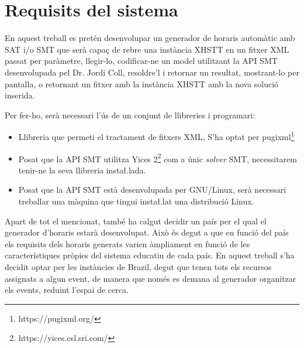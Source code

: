 \documentclass[11pt,a4paper,twoside]{report}
\begin{document}
  \chapter{Requisits del sistema}

  En aquest treball es pretén desenvolupar un generador de horaris automàtic 
  amb SAT i/o SMT que serà capaç de rebre una instància XHSTT en un fitxer XML passat per paràmetre, 
  llegir-lo, codificar-ne un model utilitzant la API SMT desenvolupada pel Dr. Jordi Coll, resoldre'l i retornar un resultat, mostrant-lo per pantalla, o retornant un fitxer amb la instància XHSTT amb la nova solució inserida.

  Per fer-ho, serà necessari l'ús de un conjunt de llibreries i programari:

  \begin{itemize}
    \item Llibreria que permeti el tractament de fitxers XML, S'ha optat per pugixml\footnote{https://pugixml.org/}
    \item Posat que la API SMT utilitza Yices 2\footnote{https://yices.csl.sri.com/} com a únic \textit{solver} SMT, necessitarem tenir-ne la seva llibreria insta\l.lada.
    \item Posat que la API SMT està desenvolupada per GNU/Linux, serà necessari treballar una màquina que tingui insta\l.lat una distribució Linux.
  \end{itemize}
  
  Apart de tot el mencionat, també ha calgut decidir un país per el qual el generador d'horaris estarà desenvolupat. Això és degut a que en funció del país els requisits dels horaris generats varien àmpliament en funció de les característiques pròpies del sistema educatiu de cada país.
  En aquest treball s'ha decidit optar per les instàncies de Brazil, degut que tenen tots els recursos assignats a algun event, de manera que només es demana al generador organitzar els events, reduint l'espai de cerca.
 
\end{document}
